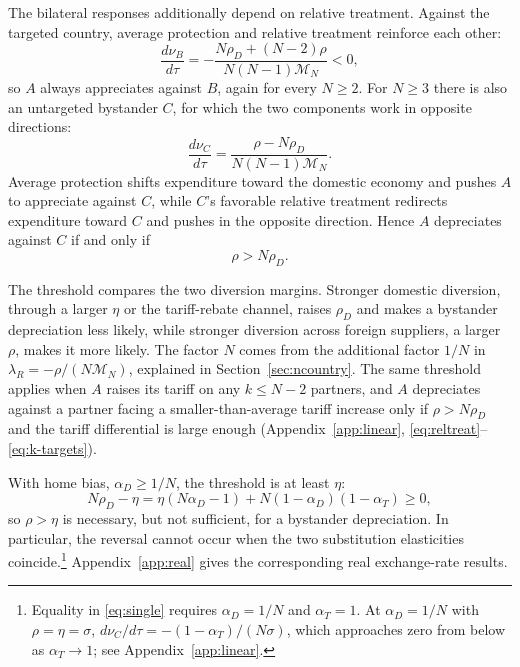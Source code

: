 \documentclass[11pt]{article}
\begin{document}
The bilateral responses additionally depend on relative treatment. Against the targeted country, average protection and relative treatment reinforce each other:
\begin{equation}
\frac{d\nu_B}{d\tau}
=-\frac{N\rho_D+(N-2)\rho}{N(N-1)\mathcal M_N}<0,
\label{eq:N-slopes}
\end{equation}
so $A$ always appreciates against $B$, again for every $N\geq2$. For $N\geq3$ there is also an untargeted bystander $C$, for which the two components work in opposite directions:
\begin{equation}
\frac{d\nu_C}{d\tau}
=\frac{\rho-N\rho_D}{N(N-1)\mathcal M_N}.
\label{eq:N-slopes-C}
\end{equation}
Average protection shifts expenditure toward the domestic economy and pushes $A$ to appreciate against $C$, while $C$'s favorable relative treatment redirects expenditure toward $C$ and pushes in the opposite direction. Hence $A$ depreciates against $C$ if and only if
\begin{equation}
\rho>N\rho_D.
\label{eq:Nthresh}
\end{equation}

The threshold compares the two diversion margins. Stronger domestic diversion, through a larger $\eta$ or the tariff-rebate channel, raises $\rho_D$ and makes a bystander depreciation less likely, while stronger diversion across foreign suppliers, a larger $\rho$, makes it more likely. The factor $N$ comes from the additional factor $1/N$ in $\lambda_R=-\rho/(N\mathcal M_N)$, explained in Section~\ref{sec:ncountry}. The same threshold applies when $A$ raises its tariff on any $k\leq N-2$ partners, and $A$ depreciates against a partner facing a smaller-than-average tariff increase only if $\rho>N\rho_D$ and the tariff differential is large enough (Appendix~\ref{app:linear}, \eqref{eq:reltreat}--\eqref{eq:k-targets}).

With home bias, $\alpha_D\geq1/N$, the threshold is at least $\eta$:
\begin{equation}
N\rho_D-\eta=\eta(N\alpha_D-1)+N(1-\alpha_D)(1-\alpha_T)\geq0,
\label{eq:single}
\end{equation}
so $\rho>\eta$ is necessary, but not sufficient, for a bystander depreciation. In particular, the reversal cannot occur when the two substitution elasticities coincide.\footnote{Equality in \eqref{eq:single} requires $\alpha_D=1/N$ and $\alpha_T=1$. At $\alpha_D=1/N$ with $\rho=\eta=\sigma$, $d\nu_C/d\tau=-(1-\alpha_T)/(N\sigma)$, which approaches zero from below as $\alpha_T\to1$; see Appendix~\ref{app:linear}.} Appendix~\ref{app:real} gives the corresponding real exchange-rate results.
\end{document}
